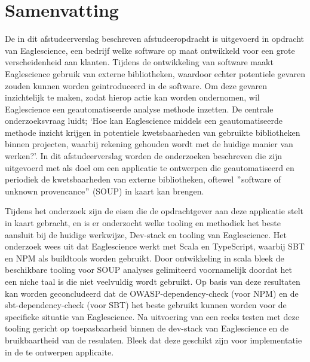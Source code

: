 


\chapter{Samenvatting}\label{ch:samenvatting}

De in dit afstudeerverslag beschreven afstudeeropdracht is uitgevoerd in opdracht van Eaglescience, een bedrijf welke software op maat ontwikkeld voor een grote verscheidenheid aan klanten. Tijdens de ontwikkeling van software maakt Eaglescience gebruik van externe bibliotheken, waardoor echter potentiele gevaren zouden kunnen worden geintroduceerd in de software. Om deze gevaren inzichtelijk te maken, zodat hierop actie kan worden ondernomen, wil Eaglescience een geautomatiseerde analyse methode inzetten. De centrale onderzoeksvraag luidt; ‘Hoe kan Eaglescience middels een geautomatiseerde methode inzicht krijgen in potentiele kwetsbaarheden van gebruikte bibliotheken binnen projecten, waarbij rekening gehouden wordt met de huidige manier van werken?’. In dit afstudeerverslag worden de onderzoeken beschreven die zijn uitgevoerd met als doel om een applicatie te ontwerpen die geautomatiseerd en periodiek de kwetsbaarheden van externe bibliotheken, oftewel $"$software of unknown provencance$"$ (SOUP) in kaart kan brengen.

Tijdens het onderzoek zijn de eisen die de opdrachtgever aan deze applicatie stelt in kaart gebracht, en is er onderzocht welke tooling en methodiek het beste aansluit bij de huidige werkwijze, Dev-stack en tooling van Eaglescience. Het onderzoek wees uit dat Eaglescience werkt met Scala en TypeScript, waarbij SBT en NPM als buildtools worden gebruikt. Door ontwikkeling in scala bleek de beschikbare tooling voor SOUP analyses gelimiteerd voornamelijk doordat het een niche taal is die niet veelvuldig wordt gebruikt. Op basis van deze resultaten kan worden geconcludeerd dat de OWASP-dependency-check (voor NPM) en de sbt-dependency-check (voor SBT) het beste gebruikt kunnen worden voor de specifieke situatie van Eaglescience.
Na uitvoering van een reeks testen met deze tooling gericht op toepasbaarheid binnen de dev-stack van Eaglescience en de bruikbaartheid van de resulaten. Bleek dat deze geschikt zijn voor implementatie in de te ontwerpen applicaite.

